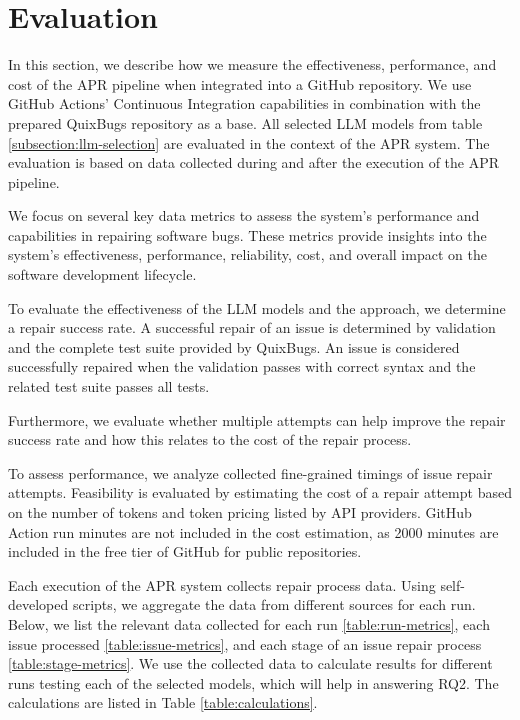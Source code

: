 \section{Evaluation} \label{section:evaluation}
In this section, we describe how we measure the effectiveness, performance, and cost of the APR pipeline when integrated into a GitHub repository. We use GitHub Actions' Continuous Integration capabilities in combination with the prepared QuixBugs repository as a base. All selected LLM models from table \ref{subsection:llm-selection} are evaluated in the context of the APR system. The evaluation is based on data collected during and after the execution of the APR pipeline.

We focus on several key data metrics to assess the system's performance and capabilities in repairing software bugs. These metrics provide insights into the system's effectiveness, performance, reliability, cost, and overall impact on the software development lifecycle.

To evaluate the effectiveness of the LLM models and the approach, we determine a repair success rate. A successful repair of an issue is determined by validation and the complete test suite provided by QuixBugs. An issue is considered successfully repaired when the validation passes with correct syntax and the related test suite passes all tests.

Furthermore, we evaluate whether multiple attempts can help improve the repair success rate and how this relates to the cost of the repair process.

To assess performance, we analyze collected fine-grained timings of issue repair attempts. Feasibility is evaluated by estimating the cost of a repair attempt based on the number of tokens and token pricing listed by API providers. GitHub Action run minutes are not included in the cost estimation, as 2000 minutes are included in the free tier of GitHub for public repositories.

Each execution of the APR system collects repair process data. Using self-developed scripts, we aggregate the data from different sources for each run. Below, we list the relevant data collected for each run \ref{table:run-metrics}, each issue processed \ref{table:issue-metrics}, and each stage of an issue repair process \ref{table:stage-metrics}. We use the collected data to calculate results for different runs testing each of the selected models, which will help in answering RQ2. The calculations are listed in Table \ref{table:calculations}.

